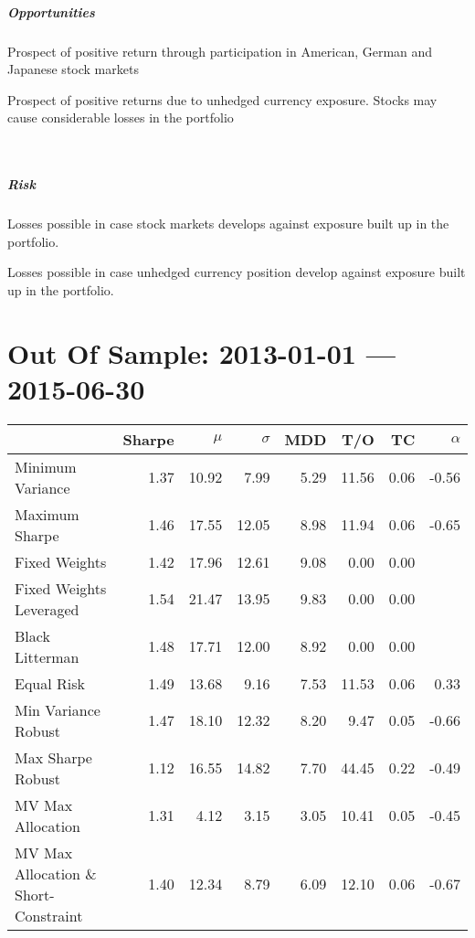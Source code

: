 \documentclass[11pt, DIV=15]{scrreprt}
\begin{document}
\begin{minipage}[t]{0.49\textwidth}
  \paragraph{Opportunities}
  \begin{sit}
  \item Prospect of positive return through participation in American, German and Japanese stock markets
  \item Prospect of positive returns due to unhedged currency exposure. Stocks may cause considerable losses in the portfolio
  \end{sit}
\end{minipage}
~~
\begin{minipage}[t]{0.49\textwidth}
  \paragraph{Risk}
  \begin{sit}
  \item Losses possible in case stock markets develops against exposure built up in the portfolio.
  \item Losses possible in case unhedged currency position develop against exposure built up in the portfolio.
  \end{sit}
\end{minipage}

\chapter*{Out Of Sample: 2013-01-01 --- 2015-06-30}
\begin{table}[ht]
\centering
\begin{tabular}{lrrrrrrr}
\toprule
                      & Sharpe & $\mu$ &$\sigma$& MDD & T/O & TC & $\alpha$ \\ 
\midrule
Minimum Variance & 1.37 & 10.92 & 7.99 & 5.29 & 11.56 & 0.06 & -0.56 \\ 
  Maximum Sharpe & 1.46 & 17.55 & 12.05 & 8.98 & 11.94 & 0.06 & -0.65 \\ 
  Fixed Weights & 1.42 & 17.96 & 12.61 & 9.08 & 0.00 & 0.00 &  \\ 
  Fixed Weights Leveraged & 1.54 & 21.47 & 13.95 & 9.83 & 0.00 & 0.00 &  \\ 
  Black Litterman & 1.48 & 17.71 & 12.00 & 8.92 & 0.00 & 0.00 &  \\ 
  Equal Risk & 1.49 & 13.68 & 9.16 & 7.53 & 11.53 & 0.06 & 0.33 \\ 
  Min Variance Robust & 1.47 & 18.10 & 12.32 & 8.20 & 9.47 & 0.05 & -0.66 \\ 
  Max Sharpe Robust & 1.12 & 16.55 & 14.82 & 7.70 & 44.45 & 0.22 & -0.49 \\ 
  MV Max Allocation & 1.31 & 4.12 & 3.15 & 3.05 & 10.41 & 0.05 & -0.45 \\ 
  MV Max Allocation \& Short-Constraint & 1.40 & 12.34 & 8.79 & 6.09 & 12.10 & 0.06 & -0.67 \\ 
\bottomrule
\end{tabular}
\end{table}
\end{document}
